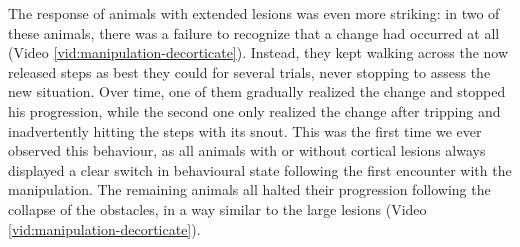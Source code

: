 The response of animals with extended lesions was even more striking: in two of these animals, there was a failure to recognize that a change had occurred at all (Video \ref{vid:manipulation-decorticate}). Instead, they kept walking across the now released steps as best they could for several trials, never stopping to assess the new situation. Over time, one of them gradually realized the change and stopped his progression, while the second one only realized the change after tripping and inadvertently hitting the steps with its snout. This was the first time we ever observed this behaviour, as all animals with or without cortical lesions always displayed a clear switch in behavioural state following the first encounter with the manipulation. The remaining animals all halted their progression following the collapse of the obstacles, in a way similar to the large lesions (Video \ref{vid:manipulation-decorticate}).
